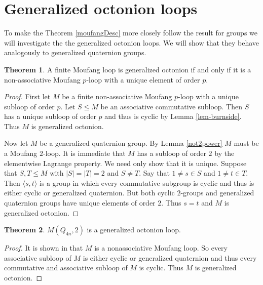 \documentclass[12pt]{report}
\theoremstyle{definition}
\newtheorem{thm}{Theorem}[chapter]
\begin{document}

\section{Generalized octonion loops}

To make the Theorem \ref{moufangDesc} more closely follow the result for groups we will investigate the
  the generalized octonion loops. We will show that they behave analogously to generalized quaternion groups.

\begin{thm}
  A finite Moufang loop is generalized octonion if and only if it is a non-associative Moufang $p$-loop
    with a unique element of order $p$.
\end{thm}

\begin{proof}
  First let $M$ be a finite non-associative Moufang $p$-loop with a unique subloop of order $p$. Let $S\leq M$ be
    an associative commutative subloop. Then $S$ has a unique subloop of order $p$ and thus is cyclic by
    Lemma \ref{lem-burnside}. Thus $M$ is generalized octonion.

  Now let $M$ be a generalized quaternion group. By Lemma \ref{not2power} $M$ must be a Moufang $2$-loop. It is
    immediate that $M$ has a subloop of order $2$ by the elementwise Lagrange property. We need only show that it
    is unique. Suppose that $S, T\leq M$ with $|S| = |T| = 2$ and $S\neq T$. Say that $1\neq s\in S$ and $1\neq t\in T$.
    Then $\langle s, t\rangle$ is a group in which every commutative subgroup is cyclic and thus is either cyclic or
    generalized quaternion. But both cyclic $2$-groups and generalized quaternion groups have unique elements of order
    $2$. Thus $s = t$ and $M$ is generalized octonion.
\end{proof}

\begin{thm}\label{doubling}
  $M(Q_{4n}, 2)$ is a generalized octonion loop.
\end{thm}

\begin{proof}
  It is shown in \cite{Chein} that $M$ is a nonassociative Moufang loop. So every associative subloop of
    $M$ is either cyclic or generalized quaternion and thus every commutative and associative subloop of
    $M$ is cyclic. Thus $M$ is generalized octonion.
\end{proof}
\end{document}

